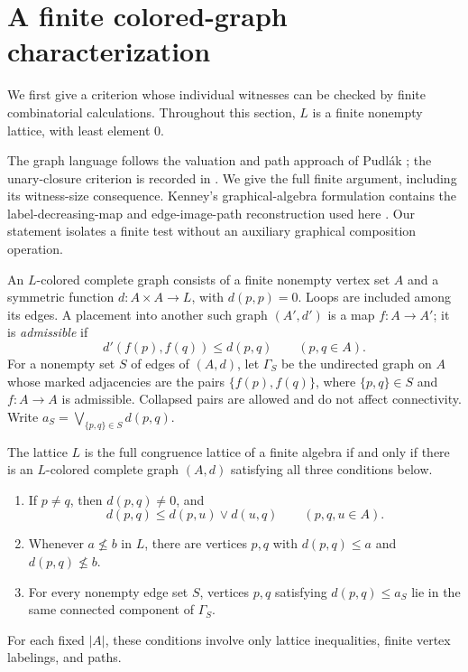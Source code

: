 \section{A finite colored-graph characterization}\label{sec:graph}

We first give a criterion whose individual witnesses can be checked by finite
combinatorial calculations. Throughout this section, $L$ is a finite nonempty
lattice, with least element $0$.

The graph language follows the valuation and path approach of
Pudl\'ak \citep[Definitions~1--3 and pp.~271--272]{Pudlak1976}; the
unary-closure criterion is recorded in
\citet[Theorem~3.2.1]{DeMeo2012}.  We give the full finite argument,
including its witness-size consequence.  Kenney's graphical-algebra
formulation contains the label-decreasing-map and edge-image-path
reconstruction used here
\citep{Kenney2010}\citep[pp.~51--58]{Kenney2009Slides}.
Our statement isolates a finite test without an auxiliary graphical
composition operation.

\begin{definition}\label{f:def-placement}
An $L$-colored complete graph consists of a finite nonempty vertex set $A$ and a
symmetric function $d:A\times A\to L$, with $d(p,p)=0$. Loops are included among
its edges. A placement into another such graph $(A',d')$ is a map $f:A\to A'$;
it is \emph{admissible} if
\[
 d'(f(p),f(q))\le d(p,q)\qquad(p,q\in A).
\]
For a nonempty set $S$ of edges of $(A,d)$, let $\Gamma_S$ be the undirected
graph on $A$ whose marked adjacencies are the pairs
$\{f(p),f(q)\}$, where $\{p,q\}\in S$ and $f:A\to A$ is admissible.
Collapsed pairs are allowed and do not affect connectivity. Write
$a_S=\bigvee_{\{p,q\}\in S}d(p,q)$.
\end{definition}

\begin{theorem}\label{f:criterion}
The lattice $L$ is the full congruence lattice of a finite algebra if and only
if there is an $L$-colored complete graph $(A,d)$ satisfying all three
conditions below.
\begin{enumerate}[label=\textup{(\roman*)}]
\item\label{f:graph-triangle} If $p\ne q$, then $d(p,q)\ne0$, and
\[
 d(p,q)\le d(p,u)\vee d(u,q)\qquad(p,q,u\in A).
\]
\item\label{f:graph-reflection} Whenever $a\not\le b$ in $L$, there are vertices
$p,q$ with $d(p,q)\le a$ and $d(p,q)\not\le b$.
\item\label{f:graph-connectivity} For every nonempty edge set $S$, vertices
$p,q$ satisfying $d(p,q)\le a_S$ lie in the same connected component of
$\Gamma_S$.
\end{enumerate}
For each fixed $|A|$, these conditions involve only lattice inequalities,
finite vertex labelings, and paths.
\end{theorem}


